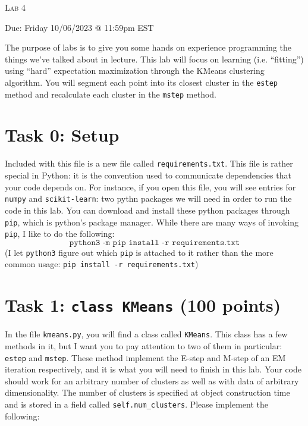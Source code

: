 \documentclass[11pt]{article}
\newcommand{\task}[1]{\section*{\normalsize #1}}
\begin{document}
\begin{center}
    {\Large \textsc{Lab 4}}
\end{center}
\begin{center}
    Due: Friday 10/06/2023 @ 11:59pm EST
\end{center}

\noindent The purpose of labs is to give you some hands on experience programming the things we've talked about in lecture.
This lab will focus on learning (i.e. ``fitting'') using ``hard'' expectation maximization through the KMeans clustering algorithm.
You will segment each point into its closest cluster in the \texttt{estep} method and recalculate each cluster in the \texttt{mstep} method.
\newline


\task{Task 0: Setup}
Included with this file is a new file called \texttt{requirements.txt}. This file is rather special in Python: it is the convention used to communicate dependencies that your code depends on. For instance, if you open this file, you will see entries for \texttt{numpy} and \texttt{scikit-learn}: two pythn packages we will need in order to run the code in this lab. You can download and install these python packages through \texttt{pip}, which is python's package manager. While there are many ways of invoking \texttt{pip}, I like to do the following:
$$\texttt{python3 -m pip install -r requirements.txt}$$
(I let \texttt{python3} figure out which \texttt{pip} is attached to it rather than the more common usage: \texttt{pip install -r requirements.txt})



\task{Task 1: \texttt{class KMeans} (100 points)}
In the file \texttt{kmeans.py}, you will find a class called \texttt{KMeans}.
This class has a few methods in it, but I want you to pay attention to two of them in particular: \texttt{estep} and \texttt{mstep}.
These method implement the E-step and M-step of an EM iteration respectively, and it is what you will need to finish in this lab.
Your code should work for an arbitrary number of clusters as well as with data of arbitrary dimensionality.
The number of clusters is specified at object construction time and is stored in a field called \texttt{self.num\_clusters}.
Please implement the following:
\end{document}
